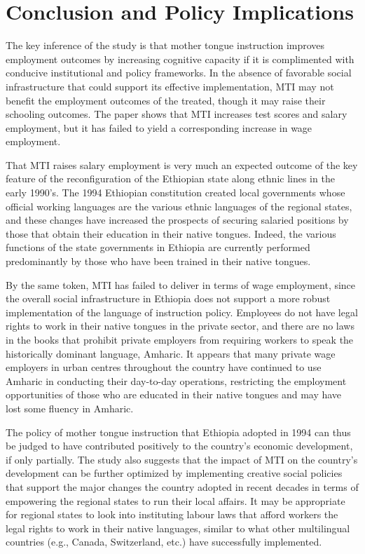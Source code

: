 
\section{Conclusion and Policy Implications}

The key inference of the study is that mother tongue instruction improves employment outcomes by increasing cognitive capacity if it is complimented with conducive institutional and policy frameworks. In the absence of favorable social infrastructure that could support its effective implementation, MTI may not benefit the employment outcomes of the treated, though it may raise their schooling outcomes. The paper shows that MTI increases test scores and salary employment, but it has failed to yield a corresponding increase in wage employment. 

That MTI raises salary employment is very much an expected outcome of the key feature of the reconfiguration of the Ethiopian state along ethnic lines in the early 1990’s. The 1994 Ethiopian constitution created local governments whose official working languages are the various ethnic languages of the regional states, and these changes have increased the prospects of securing salaried positions by those that obtain their education in their native tongues. Indeed, the various functions of the state governments in Ethiopia are currently performed predominantly by those who have been trained in their native tongues. 

By the same token, MTI has failed to deliver in terms of wage employment, since the overall social infrastructure in Ethiopia does not support a more robust implementation of the language of instruction policy. Employees do not have legal rights to work in their native tongues in the private sector, and there are no laws in the books that prohibit private employers from requiring workers to speak the historically dominant language, Amharic. It appears that many private wage employers in urban centres throughout the country have continued to use Amharic in conducting their day-to-day operations, restricting the employment opportunities of those who are educated in their native tongues and may have lost some fluency in Amharic. 

The policy of mother tongue instruction that Ethiopia adopted in 1994 can thus be judged to have contributed positively to the country’s economic development, if only partially. The study also suggests that the impact of MTI on the country’s development can be further optimized by implementing creative social policies that support the major changes the country adopted in recent decades in terms of empowering the regional states to run their local affairs. It may be appropriate for regional states to look into instituting labour laws that afford workers the legal rights to work in their native languages, similar to what other multilingual countries (e.g., Canada, Switzerland, etc.) have successfully implemented. 

